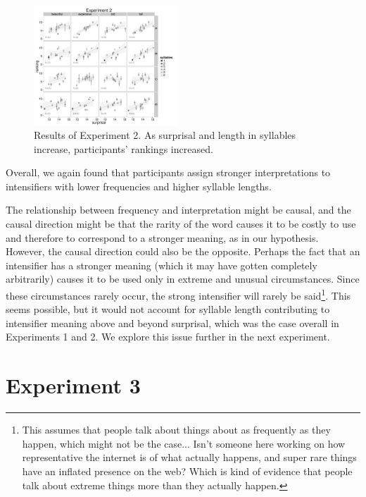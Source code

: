 \documentclass[10pt,letterpaper]{article}
\begin{document}
\begin{figure}[ht]
\begin{center}
\includegraphics[width=0.48\textwidth]{analysis_files_for_writeup/images/exp2-plot.png}
\end{center}
\caption{Results of Experiment 2. As surprisal and length in syllables increase, participants' rankings increased.} 
\label{exp2-plot}
\end{figure}

Overall, we again found that participants assign stronger interpretations to intensifiers with lower frequencies and higher syllable lengths.

The relationship between frequency and interpretation might be causal, and the causal direction might be that the rarity of the word causes it to be costly to use and therefore to correspond to a stronger meaning, as in our hypothesis.
However, the causal direction could also be the opposite.
Perhaps the fact that an intensifier has a stronger meaning (which it may have gotten completely arbitrarily) causes it to be used only in extreme and unusual circumstances.
Since these circumstances rarely occur, the strong intensifier will rarely be said\footnote{This assumes that people talk about things about as frequently as they happen, which might not be the case... Isn't someone here working on how representative the internet is of what actually happens, and super rare things have an inflated presence on the web? Which is kind of evidence that people talk about extreme things more than they actually happen.}.
This seems possible, but it would not account for syllable length contributing to intensifier meaning above and beyond surprisal,  which was the case overall in Experiments 1 and 2. 
We explore this issue further in the next experiment.

\section{Experiment 3}
\end{document}
